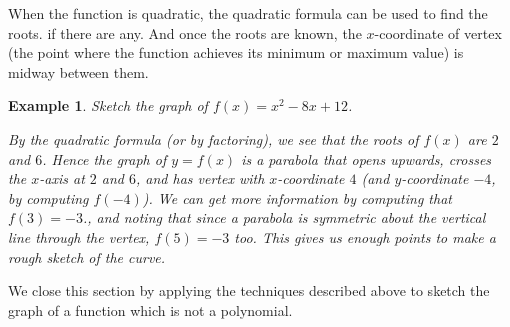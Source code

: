 \documentclass[11pt]{book}               %
\newtheorem{example}{Example}
\begin{document}
When the function is quadratic, the quadratic formula can be used to find the roots. if there are any.  
And once the roots are known, the $x$-coordinate of vertex (the point where the function achieves its minimum or maximum value) is midway between them.

\begin{example}
Sketch the graph of $f(x) = x^2-8x+12$.

\normalfont
By the quadratic formula (or by factoring), we see that the roots of $f(x)$ are $2$ and $6$.
Hence the graph of $y = f(x)$ is a parabola that opens upwards, crosses the $x$-axis at $2$ and $6$, and has vertex with $x$-coordinate $4$ (and $y$-coordinate $-4$, by computing $f(-4)$).  We can get 
more information by computing that $f(3) = -3$., and noting that since a parabola is symmetric about the
vertical line through the vertex, $f(5) = -3$ too.  This gives us enough points to make a rough sketch of the curve.

\begin{center}


\end{center}
\end{example}

We close this section by applying the techniques described above to sketch the graph of a function which is not a polynomial.
\end{document}
